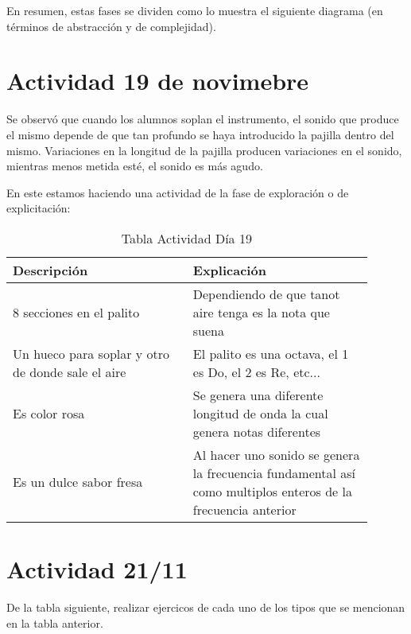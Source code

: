 \documentclass[12pt]{report}
\newcounter{it}
\theoremstyle{largebreak}
\begin{document}
    En resumen, estas fases se dividen como lo muestra el siguiente diagrama (en términos de abstracción y de complejidad).

    \section{Actividad 19 de novimebre}

    Se observó que cuando los alumnos soplan el instrumento, el sonido que produce el mismo depende de que tan profundo se haya introducido la pajilla dentro del mismo. Variaciones en la longitud de la pajilla producen variaciones en el sonido, mientras menos metida esté, el sonido es más agudo.

    En este estamos haciendo una actividad de la fase de exploración o de explicitación:

    \begin{table}[ht]
        \centering
        \begin{tabular}{p{0.45\linewidth} | p{0.45\linewidth}}
            Descripción & Explicación \\
            \hline
            8 secciones en el palito & Dependiendo de que tanot aire tenga es la nota que suena \\
            Un hueco para soplar y otro de donde sale el aire & El palito es una octava, el 1 es Do, el 2 es Re, etc...\\
            Es color rosa & Se genera una diferente longitud de onda la cual genera notas diferentes \\
            Es un dulce sabor fresa & Al hacer uno sonido se genera la frecuencia fundamental así como multiplos enteros de la frecuencia anterior \\
            
        \end{tabular}
        \caption{Tabla Actividad Día 19}
        \label{tab:my_label}
    \end{table}

    \section{Actividad 21/11}

    \begin{excer}
        De la tabla siguiente, realizar ejercicos de cada uno de los tipos que se mencionan en la tabla anterior.
    \end{excer}
\end{document}
